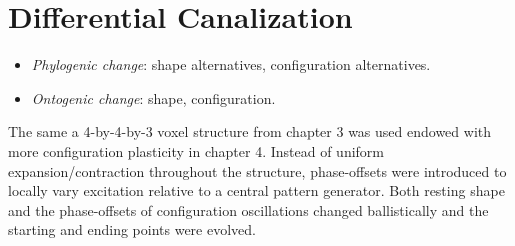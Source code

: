 



\section{Differential Canalization}

\begin{itemize}
    \item \textit{Phylogenic change}: shape alternatives, configuration alternatives.
    \item \textit{Ontogenic change}: shape, configuration.
\end{itemize}


\noindent
The same
a 4-by-4-by-3 voxel
structure from chapter 3 was used endowed with more configuration plasticity in chapter 4.
Instead of uniform expansion/contraction throughout the structure,
phase-offsets were introduced to locally vary excitation relative to a central pattern generator.
Both resting shape and the phase-offsets of configuration oscillations changed ballistically and the starting and ending points were evolved.


